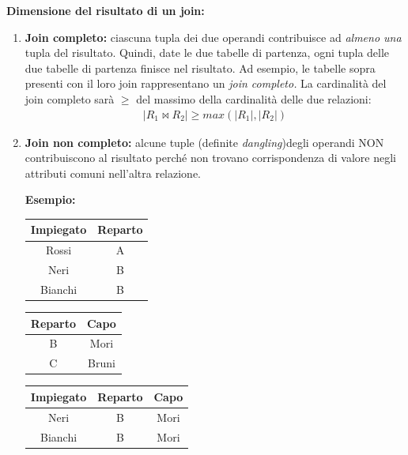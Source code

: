 \documentclass{article}
\newcounter{esempio}
\begin{document}
\begin{itemize}
\textbf{Dimensione del risultato di un join:} \begin{enumerate}
    \item \textbf{Join completo:} ciascuna tupla dei due operandi contribuisce ad \textit{almeno una} tupla del risultato. Quindi, date le due tabelle di partenza, ogni tupla delle due tabelle di partenza finisce nel risultato. Ad esempio, le tabelle sopra presenti con il loro join rappresentano un \textit{join completo.} La cardinalità del join completo sarà $\geq$ del massimo della cardinalità delle due relazioni: \begin{align*}
        | R_1 \bowtie R_2 | \geq max(|R_1|,|R_2|)
    \end{align*}
    \item \textbf{Join non completo:} alcune tuple (definite \textit{dangling})degli operandi NON contribuiscono al risultato perché non trovano corrispondenza di valore negli attributi comuni nell'altra relazione.

    
\textbf{Esempio:}

\begin{minipage}{.25\textwidth}
  \centering
    \begin{tabular}{|c|c|}
        \hline
        \textbf{Impiegato} & \textbf{Reparto} \\
        \hline
        Rossi & A \\
        \hline
        Neri &  B \\
        \hline
        Bianchi & B \\
         \hline
        \end{tabular}
\end{minipage}%
\hfill
\begin{minipage}{.25\textwidth}
  \centering
       \begin{tabular}{|c|c|}
        \hline
        \textbf{Reparto} & \textbf{Capo} \\
        \hline
        B & Mori\\
        \hline
        C & Bruni\\
         \hline
        \end{tabular}
\end{minipage}
\hfill
\begin{minipage}{.25\textwidth}
  \centering
       \begin{tabular}{|c|c|c|}
        \hline
        \textbf{Impiegato} & \textbf{Reparto} & \textbf{Capo} \\
        \hline
        Neri & B & Mori\\
         \hline
         Bianchi & B & Mori\\
         \hline
        \end{tabular}
\hspace{1em}
\end{minipage}


\end{enumerate}
\end{itemize}
\end{document}
